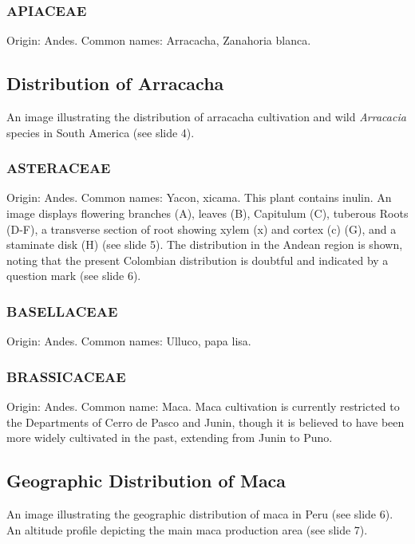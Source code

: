 \subsubsection{APIACEAE} 
Origin: Andes. Common names: Arracacha, Zanahoria blanca.

\subsection{Distribution of Arracacha} 
An image illustrating the distribution of arracacha cultivation and wild \textit{Arracacia} species in South America (see slide 4).

\subsubsection{ASTERACEAE} 
Origin: Andes. Common names: Yacon, xicama. This plant contains inulin. An image displays flowering branches (A), leaves (B), Capitulum (C), tuberous Roots (D-F), a transverse section of root showing xylem (x) and cortex (c) (G), and a staminate disk (H) (see slide 5). The distribution in the Andean region is shown, noting that the present Colombian distribution is doubtful and indicated by a question mark (see slide 6).

\subsubsection{BASELLACEAE} 
Origin: Andes. Common names: Ulluco, papa lisa.

\subsubsection{BRASSICACEAE} 
Origin: Andes. Common name: Maca. Maca cultivation is currently restricted to the Departments of Cerro de Pasco and Junin, though it is believed to have been more widely cultivated in the past, extending from Junin to Puno.

\subsection{Geographic Distribution of Maca} 
An image illustrating the geographic distribution of maca in Peru (see slide 6). An altitude profile depicting the main maca production area (see slide 7).

